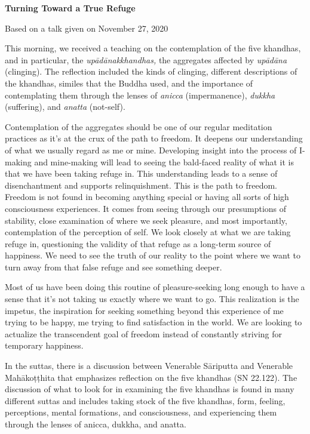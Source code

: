 \textbf{Turning Toward a True Refuge}

Based on a talk given on November 27, 2020

This morning, we received a teaching on the contemplation of the five khandhas, and in particular, the \emph{upādānakkhandhas,} the aggregates affected by \emph{upādāna} (clinging). The reflection included the kinds of clinging, different descriptions of the khandhas, similes that the Buddha used, and the importance of contemplating them through the lenses of \emph{anicca} (impermanence), \emph{dukkha} (suffering), and \emph{anatta} (not-self).

Contemplation of the aggregates should be one of our regular meditation practices as it's at the crux of the path to freedom. It deepens our understanding of what we usually regard as me or mine. Developing insight into the process of I-making and mine-making will lead to seeing the bald-faced reality of what it is that we have been taking refuge in. This understanding leads to a sense of disenchantment and supports relinquishment. This is the path to freedom. Freedom is not found in becoming anything special or having all sorts of high consciousness experiences. It comes from seeing through our presumptions of stability, close examination of where we seek pleasure, and most importantly, contemplation of the perception of self. We look closely at what we are taking refuge in, questioning the validity of that refuge as a long-term source of happiness. We need to see the truth of our reality to the point where we want to turn away from that false refuge and see something deeper.

Most of us have been doing this routine of pleasure-seeking long enough to have a sense that it's not taking us exactly where we want to go. This realization is the impetus, the inspiration for seeking something beyond this experience of me trying to be happy, me trying to find satisfaction in the world. We are looking to actualize the transcendent goal of freedom instead of constantly striving for temporary happiness.

In the suttas, there is a discussion between Venerable Sāriputta and Venerable Mahākoṭṭhita that emphasizes reflection on the five khandhas (SN 22.122). The discussion of what to look for in examining the five khandhas is found in many different suttas and includes taking stock of the five khandhas, form, feeling, perceptions, mental formations, and consciousness, and experiencing them through the lenses of anicca, dukkha, and anatta.

